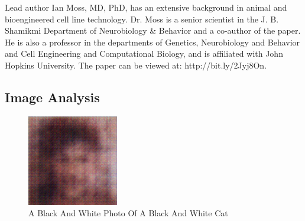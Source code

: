 \documentclass{article}%
\begin{document}
Lead author Ian Moss, MD, PhD, has an extensive background in animal and bioengineered cell line technology. Dr. Moss is a senior scientist in the J. B. Shamikmi Department of Neurobiology \& Behavior and a co{-}author of the paper. He is also a professor in the departments of Genetics, Neurobiology and Behavior and Cell Engineering and Computational Biology, and is affiliated with John Hopkins University. The paper can be viewed at: http://bit.ly/2Jyj8On.

%
\subsection{Image Analysis}%
\label{subsec:ImageAnalysis}%


\begin{figure}[h!]%
\centering%
\includegraphics[width=150px]{500_fake_images/samples_5_118.png}%
\caption{A Black And White Photo Of A Black And White Cat}%
\end{figure}

%
\end{document}
